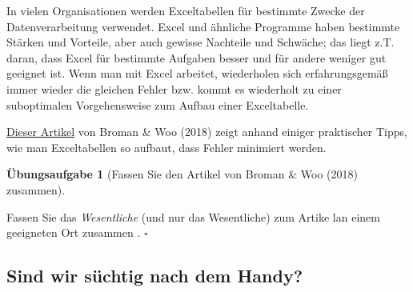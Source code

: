 \documentclass[
  letterpaper,
  oneside,
  open=any]{scrbook}
\theoremstyle{definition}
\newtheorem{exercise}{Übungsaufgabe}[chapter]
\theoremstyle{definition}
\theoremstyle{definition}
\theoremstyle{remark}
\begin{document}
In vielen Organisationen werden Exceltabellen für bestimmte Zwecke der
Datenverarbeitung verwendet. Excel und ähnliche Programme haben
bestimmte Stärken und Vorteile, aber auch gewisse Nachteile und
Schwäche; das liegt z.T. daran, dass Excel für bestimmte Aufgaben besser
und für andere weniger gut geeignet ist. Wenn man mit Excel arbeitet,
wiederholen sich erfahrungsgemäß immer wieder die gleichen Fehler bzw.
kommt es wiederholt zu einer suboptimalen Vorgehensweise zum Aufbau
einer Exceltabelle.

\href{https://www.tandfonline.com/doi/full/10.1080/00031305.2017.1375989}{Dieser
Artikel} von Broman \& Woo (2018) zeigt anhand einiger praktischer
Tipps, wie man Exceltabellen so aufbaut, dass Fehler minimiert werden.

\begin{exercise}[Fassen Sie den Artikel von Broman \& Woo (2018)
zusammen]\protect\hypertarget{exr-xls-paper}{}\label{exr-xls-paper}

Fassen Sie das \emph{Wesentliche} (und nur das Wesentliche) zum Artike
lan einem geeigneten Ort zusammen . \(\square\)

\end{exercise}

\subsection{Sind wir süchtig nach dem
Handy?}\label{sind-wir-suxfcchtig-nach-dem-handy}
\end{document}

